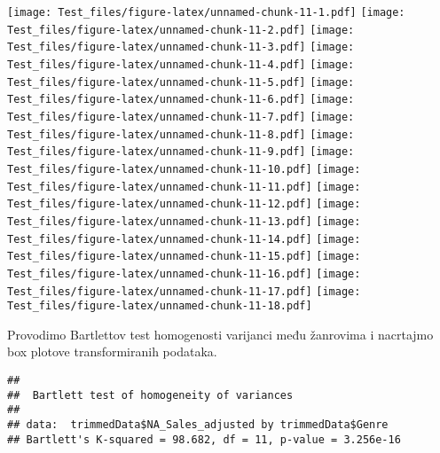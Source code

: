 \documentclass[
]{article}
\newenvironment{Shaded}{\begin{snugshade}}{\end{snugshade}}
\newcommand{\AttributeTok}[1]{\textcolor[rgb]{0.77,0.63,0.00}{#1}}
\newcommand{\CommentTok}[1]{\textcolor[rgb]{0.56,0.35,0.01}{\textit{#1}}}
\newcommand{\DecValTok}[1]{\textcolor[rgb]{0.00,0.00,0.81}{#1}}
\newcommand{\FunctionTok}[1]{\textcolor[rgb]{0.00,0.00,0.00}{#1}}
\newcommand{\NormalTok}[1]{#1}
\newcommand{\SpecialCharTok}[1]{\textcolor[rgb]{0.00,0.00,0.00}{#1}}
\newcommand{\StringTok}[1]{\textcolor[rgb]{0.31,0.60,0.02}{#1}}
\begin{document}
\texttt{[image: Test\_files/figure-latex/unnamed-chunk-11-1.pdf]}
\texttt{[image: Test\_files/figure-latex/unnamed-chunk-11-2.pdf]}
\texttt{[image: Test\_files/figure-latex/unnamed-chunk-11-3.pdf]}
\texttt{[image: Test\_files/figure-latex/unnamed-chunk-11-4.pdf]}
\texttt{[image: Test\_files/figure-latex/unnamed-chunk-11-5.pdf]}
\texttt{[image: Test\_files/figure-latex/unnamed-chunk-11-6.pdf]}
\texttt{[image: Test\_files/figure-latex/unnamed-chunk-11-7.pdf]}
\texttt{[image: Test\_files/figure-latex/unnamed-chunk-11-8.pdf]}
\texttt{[image: Test\_files/figure-latex/unnamed-chunk-11-9.pdf]}
\texttt{[image: Test\_files/figure-latex/unnamed-chunk-11-10.pdf]}
\texttt{[image: Test\_files/figure-latex/unnamed-chunk-11-11.pdf]}
\texttt{[image: Test\_files/figure-latex/unnamed-chunk-11-12.pdf]}
\texttt{[image: Test\_files/figure-latex/unnamed-chunk-11-13.pdf]}
\texttt{[image: Test\_files/figure-latex/unnamed-chunk-11-14.pdf]}
\texttt{[image: Test\_files/figure-latex/unnamed-chunk-11-15.pdf]}
\texttt{[image: Test\_files/figure-latex/unnamed-chunk-11-16.pdf]}
\texttt{[image: Test\_files/figure-latex/unnamed-chunk-11-17.pdf]}
\texttt{[image: Test\_files/figure-latex/unnamed-chunk-11-18.pdf]}

Provodimo Bartlettov test homogenosti varijanci među žanrovima i
nacrtajmo box plotove transformiranih podataka.

\begin{Shaded}
\end{Shaded}

\begin{verbatim}
## 
##  Bartlett test of homogeneity of variances
## 
## data:  trimmedData$NA_Sales_adjusted by trimmedData$Genre
## Bartlett's K-squared = 98.682, df = 11, p-value = 3.256e-16
\end{verbatim}

\begin{Shaded}
\end{Shaded}
\end{document}
